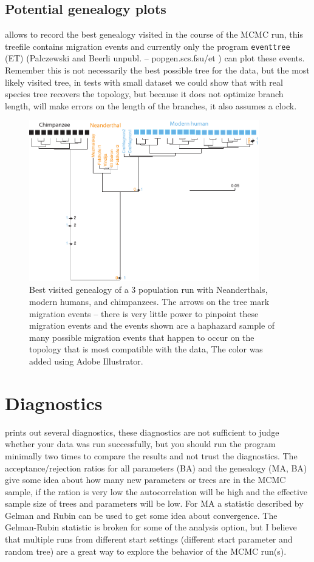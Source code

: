 \section{Potential genealogy plots}
\migrate allows to record the best genealogy visited in the course of the MCMC run, this treefile contains migration events and currently only the program {\tt eventtree} (ET) (Palczewski and Beerli unpubl. -- popgen.scs.fsu/et ) can plot these events. Remember this is not necessarily the best possible tree for the data, but the most likely visited tree, in tests with small dataset we could show that with real species tree \migrate recovers the topology, but because it does not optimize branch length, will make errors on the length of the branches, it also assumes a clock.
\begin{figure}[bh]
\centering \includegraphics[width=10cm]{mim/human_tree}
\caption{Best visited genealogy of a 3 population run with Neanderthals, modern humans, and chimpanzees. The arrows on the tree mark migration events --  there is very little power to pinpoint these migration events and the events shown are a haphazard sample of many possible migration events that happen to occur on the topology that is most compatible with the data, The color was added using Adobe Illustrator.\label{MIGTREE}}
\end{figure}

\newpage
\chapter{Diagnostics}
\migrate prints out several diagnostics, these diagnostics are not sufficient to judge whether your data was run successfully, but you should run the program minimally two times to compare the results and not trust the diagnostics. The acceptance/rejection ratios for all parameters (BA) and the genealogy (MA, BA) give some idea about how many new parameters or trees are in the MCMC sample, if the ration is very low the autocorrelation will be high and the effective sample size of trees and parameters will be low. For MA a statistic described by Gelman and Rubin \cite{kass:1998:mcm} can be used to get some idea about convergence. The Gelman-Rubin statistic is broken for some of the analysis option, but I believe that multiple runs from different start settings (different start parameter and random tree) are a great way to explore the behavior of the MCMC run(s).

